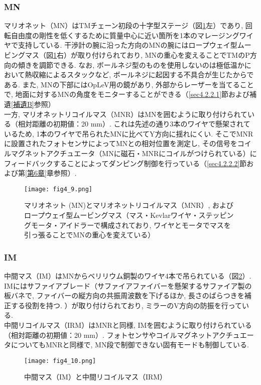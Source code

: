 \subsubsection{MN}
\vskip3mm
マリオネット（MN）はTMチェーン初段の十字型ステージ（図\ref{fig4.9}左）であり, 回転自由度の剛性を低くするために質量中心に近い箇所を1本のマレージングワイヤで支持している. 干渉計の腕に沿った方向のMNの腕にはロープウェイ型ムービングマス（図\ref{fig4.9}右）が取り付けられており, MNの重心を変えることでTMのP方向の傾きを調節できる. なお, ボールネジ型のものを使用しないのは極低温かにおいて熱収縮によるスタックなど, ボールネジに起因する不具合が生じたからである\cite{42}. また, MNの下部にはOpLeV用の鏡があり, 外部からレーザーを当てることで, 地面に対するMNの角度をモニターすることができる（\ref{sec4.2.2.1}節および補遺\ref{補遺B}参照）\\
\quad 一方, マリオネットリコイルマス（MNR）はMNを囲むように取り付けられている（相対距離の初期値：20 mm）. これは先述の通り3本のワイヤで懸架されているため, 1本のワイヤで吊られたMNに比べてY方向に揺れにくい. そこでMNRに設置されたフォトセンサによってMNとの相対位置を測定し, その信号をコイルマグネットアクチュエータ（MNに磁石・MNRにコイルがつけられている）にフィードバックすることによってダンピング制御を行っている（\ref{sec4.2.2.2}節および第\ref{第6章}章参照）. 
\begin{figure}[H]
\begin{center}
\texttt{[image: fig4\_9.png]}
\caption[マリオネット (MN)とマリオネットリコイルマス（MNR）, およびロープウェイ型ムービングマス]{マリオネット (MN)とマリオネットリコイルマス（MNR）, およびロープウェイ型ムービングマス（マス・Kevlarワイヤ・ステッピングモータ・アイドラーで構成されており, ワイヤとモータでマスを引っ張ることでMNの重心を変えている）\cite{42}}
\label{fig4.9}
\end{center}
\end{figure}
\subsubsection{IM}
\vskip3mm
中間マス（IM）はMNからベリリウム銅製のワイヤ4本で吊られている（図\ref{fig4.10}）. IMにはサファイアブレード（サファイアファイバーを懸架するサファイア製の板バネで, ファイバーの縦方向の共振周波数を下げるほか, 長さのばらつきを補正する役割を持つ. ）が取り付けられており, ミラーのV方向の防振を行っている. \\
\quad 中間リコイルマス（IRM）はMNRと同様, IMを囲むように取り付けられている（相対距離の初期値：20 mm）. フォトセンサやコイルマグネットアクチュエータについてもMNRと同様で, MN段で制御できない固有モードも制御している. 
\begin{figure}[H]
\begin{center}
\texttt{[image: fig4\_10.png]} 
\caption[中間マス（IM）と中間リコイルマス（IRM）]{中間マス（IM）と中間リコイルマス（IRM）}
\label{fig4.10}
\end{center}
\end{figure}
